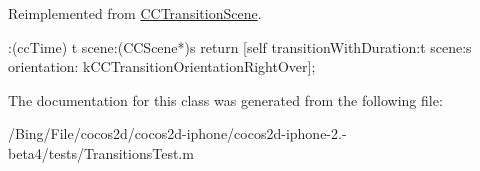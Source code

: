 Reimplemented from \hyperlink{interface_c_c_transition_scene_af49d7862a7560b4b4954dda1363cfa28}{C\-C\-Transition\-Scene}.


\begin{DoxyCode}
                            :(ccTime) t scene:(CCScene*)s {
        return [self transitionWithDuration:t scene:s orientation:
      kCCTransitionOrientationRightOver];
}
\end{DoxyCode}


The documentation for this class was generated from the following file\-:\begin{DoxyCompactItemize}
\item 
/\-Bing/\-File/cocos2d/cocos2d-\/iphone/cocos2d-\/iphone-\/2.-\/beta4/tests/Transitions\-Test.\-m\end{DoxyCompactItemize}
